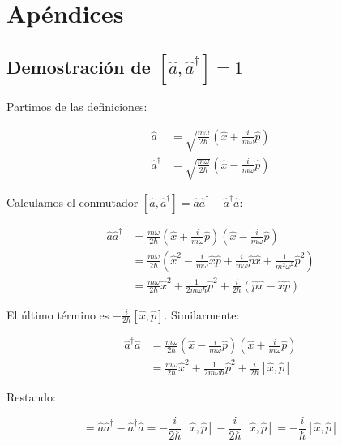 \chapter{Apéndices}

\section{Demostración de $[\hat{a}, \hat{a}^\dagger] = 1$} \label{sec:born1925}


Partimos de las definiciones:

\begin{align}
	\hat{a} &= \sqrt{\frac{m\omega}{2\hbar}}\left(\hat{x} + \frac{i}{m\omega}\hat{p}\right) \\
	\hat{a}^\dagger &= \sqrt{\frac{m\omega}{2\hbar}}\left(\hat{x} - \frac{i}{m\omega}\hat{p}\right)
\end{align}

Calculamos el conmutador $[\hat{a}, \hat{a}^\dagger] = \hat{a}\hat{a}^\dagger - \hat{a}^\dagger\hat{a}$:

\begin{align}
	\hat{a}\hat{a}^\dagger &= \frac{m\omega}{2\hbar}\left(\hat{x} + \frac{i}{m\omega}\hat{p}\right)\left(\hat{x} - \frac{i}{m\omega}\hat{p}\right) \\
	&= \frac{m\omega}{2\hbar}\left(\hat{x}^2 - \frac{i}{m\omega}\hat{x}\hat{p} + \frac{i}{m\omega}\hat{p}\hat{x} + \frac{1}{m^2\omega^2}\hat{p}^2\right) \\
	&= \frac{m\omega}{2\hbar}\hat{x}^2 + \frac{1}{2m\omega\hbar}\hat{p}^2 + \frac{i}{2\hbar}(\hat{p}\hat{x} - \hat{x}\hat{p})
\end{align}

El último término es $-\frac{i}{2\hbar}[\hat{x}, \hat{p}]$. Similarmente:

\begin{align}
	\hat{a}^\dagger\hat{a} &= \frac{m\omega}{2\hbar}\left(\hat{x} - \frac{i}{m\omega}\hat{p}\right)\left(\hat{x} + \frac{i}{m\omega}\hat{p}\right) \\
	&= \frac{m\omega}{2\hbar}\hat{x}^2 + \frac{1}{2m\omega\hbar}\hat{p}^2 + \frac{i}{2\hbar}[\hat{x}, \hat{p}]
\end{align}

Restando:

\begin{equation}
	[\hat{a}, \hat{a}^\dagger] = \hat{a}\hat{a}^\dagger - \hat{a}^\dagger\hat{a} = -\frac{i}{2\hbar}[\hat{x}, \hat{p}] - \frac{i}{2\hbar}[\hat{x}, \hat{p}] = -\frac{i}{\hbar}[\hat{x}, \hat{p}]
\end{equation}

